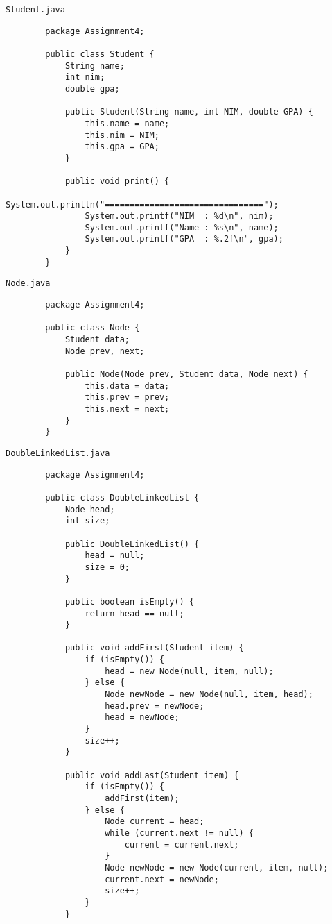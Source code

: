 \documentclass[12pt,titlepage]{article}
\begin{document}
\begin{enumerate}
    \texttt{Student.java}
    \begin{verbatim}
        package Assignment4;

        public class Student {
            String name;
            int nim;
            double gpa;

            public Student(String name, int NIM, double GPA) {
                this.name = name;
                this.nim = NIM;
                this.gpa = GPA;
            }

            public void print() {
                System.out.println("================================");
                System.out.printf("NIM  : %d\n", nim);
                System.out.printf("Name : %s\n", name);
                System.out.printf("GPA  : %.2f\n", gpa);
            }
        }
    \end{verbatim}
    \texttt{Node.java}
    \begin{verbatim}
        package Assignment4;

        public class Node {
            Student data;
            Node prev, next;

            public Node(Node prev, Student data, Node next) {
                this.data = data;
                this.prev = prev;
                this.next = next;
            }
        }
    \end{verbatim}
    \texttt{DoubleLinkedList.java}
    \begin{verbatim}
        package Assignment4;

        public class DoubleLinkedList {
            Node head;
            int size;

            public DoubleLinkedList() {
                head = null;
                size = 0;
            }

            public boolean isEmpty() {
                return head == null;
            }

            public void addFirst(Student item) {
                if (isEmpty()) {
                    head = new Node(null, item, null);
                } else {
                    Node newNode = new Node(null, item, head);
                    head.prev = newNode;
                    head = newNode;
                }
                size++;
            }

            public void addLast(Student item) {
                if (isEmpty()) {
                    addFirst(item);
                } else {
                    Node current = head;
                    while (current.next != null) {
                        current = current.next;
                    }
                    Node newNode = new Node(current, item, null);
                    current.next = newNode;
                    size++;
                }
            }


\end{verbatim}
\end{enumerate}
\end{document}
